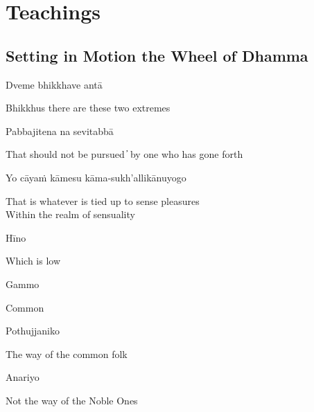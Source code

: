 
\chapter{Teachings}

\section{Setting in Motion the Wheel of Dhamma}

\begin{leader}
\end{leader}

Dveme bhikkhave antā

\begin{cprenglish}
  Bhikkhus there are these two extremes
\end{cprenglish}

Pabbajitena na sevitabbā

\begin{cprenglish}
  That should not be pursued  ̓  by one who has gone forth
\end{cprenglish}

Yo cāyaṁ kāmesu kāma-sukh’allikānuyogo

\begin{cprenglish}
  That is whatever is tied up to sense pleasures\\
  Within the realm of sensuality
\end{cprenglish}

Hīno

\begin{cprenglish}
  Which is low
\end{cprenglish}

Gammo

\begin{cprenglish}
  Common
\end{cprenglish}

Pothujjaniko

\begin{cprenglish}
  The way of the common folk
\end{cprenglish}

Anariyo

\begin{cprenglish}
  Not the way of the Noble Ones
\end{cprenglish}

